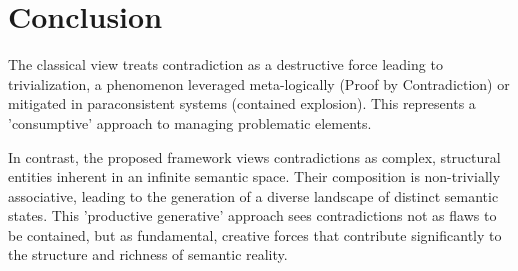 	\section{Conclusion}
	
	The classical view treats contradiction as a destructive force leading to trivialization, a phenomenon leveraged meta-logically (Proof by Contradiction) or mitigated in paraconsistent systems (contained explosion). This represents a 'consumptive' approach to managing problematic elements.
	
	In contrast, the proposed framework views contradictions as complex, structural entities inherent in an infinite semantic space. Their composition is non-trivially associative, leading to the generation of a diverse landscape of distinct semantic states. This 'productive generative' approach sees contradictions not as flaws to be contained, but as fundamental, creative forces that contribute significantly to the structure and richness of semantic reality.
